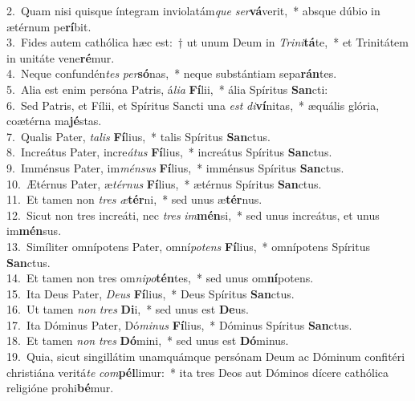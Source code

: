 {2.~}Quam nisi quisque íntegram inviolatám\textit{que} \textit{ser}\textbf{vá}verit,~* absque dúbio in ætérnum pe\textbf{rí}bit.\\
{3.~}Fides autem cathólica hæc est:~† ut unum Deum in \textit{Tri}\textit{ni}\textbf{tá}te,~* et Trinitátem in unitáte vene\textbf{ré}mur.\\
{4.~}Neque confundén\textit{tes} \textit{per}\textbf{só}nas,~* neque substántiam sepa\textbf{rán}tes.\\
{5.~}Alia est enim persóna Patris, á\textit{li}\textit{a} \textbf{Fí}lii,~* ália Spíritus \textbf{San}cti:\\
{6.~}Sed Patris, et Fílii, et Spíritus Sancti una \textit{est} \textit{di}\textbf{ví}nitas,~* æquális glória, coætérna ma\textbf{jé}stas.\\
{7.~}Qualis Pater, \textit{ta}\textit{lis} \textbf{Fí}lius,~* talis Spíritus \textbf{San}ctus.\\
{8.~}Increátus Pater, incre\textit{á}\textit{tus} \textbf{Fí}lius,~* increátus Spíritus \textbf{San}ctus.\\
{9.~}Imménsus Pater, im\textit{mén}\textit{sus} \textbf{Fí}lius,~* imménsus Spíritus \textbf{San}ctus.\\
{10.~}Ætérnus Pater, æ\textit{tér}\textit{nus} \textbf{Fí}lius,~* ætérnus Spíritus \textbf{San}ctus.\\
{11.~}Et tamen non \textit{tres} \textit{æ}\textbf{tér}ni,~* sed unus æ\textbf{tér}nus.\\
{12.~}Sicut non tres increáti, nec \textit{tres} \textit{im}\textbf{mén}si,~* sed unus increátus, et unus im\textbf{mén}sus.\\
{13.~}Simíliter omnípotens Pater, omní\textit{po}\textit{tens} \textbf{Fí}lius,~* omnípotens Spíritus \textbf{San}ctus.\\
{14.~}Et tamen non tres om\textit{ni}\textit{po}\textbf{tén}tes,~* sed unus om\textbf{ní}potens.\\
{15.~}Ita Deus Pater, \textit{De}\textit{us} \textbf{Fí}lius,~* Deus Spíritus \textbf{San}ctus.\\
{16.~}Ut tamen \textit{non} \textit{tres} \textbf{Di}i,~* sed unus est \textbf{De}us.\\
{17.~}Ita Dóminus Pater, Dó\textit{mi}\textit{nus} \textbf{Fí}lius,~* Dóminus Spíritus \textbf{San}ctus.\\
{18.~}Et tamen \textit{non} \textit{tres} \textbf{Dó}mini,~* sed unus est \textbf{Dó}minus.\\
{19.~}Quia, sicut singillátim unamquámque persónam Deum ac Dóminum confitéri christiána veritá\textit{te} \textit{com}\textbf{pél}limur:~* ita tres Deos aut Dóminos dícere cathólica religióne prohi\textbf{bé}mur.\\
